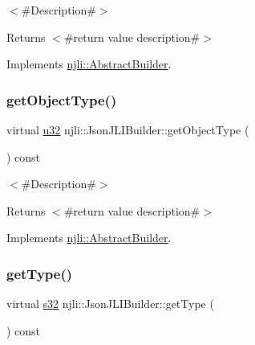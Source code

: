 $<$\#\+Description\#$>$

\begin{DoxyReturn}{Returns}
$<$\#return value description\#$>$ 
\end{DoxyReturn}


Implements \mbox{\hyperlink{classnjli_1_1_abstract_builder_a902f73ea78031b06aca183a417f3413b}{njli\+::\+Abstract\+Builder}}.

\mbox{\label{classnjli_1_1_json_j_l_i_builder_a82d8ed9acc042c7bc9c9a335120d8264}} 
\subsubsection{\texorpdfstring{get\+Object\+Type()}{getObjectType()}}
{\footnotesize\ttfamily virtual \mbox{\hyperlink{_util_8h_a10e94b422ef0c20dcdec20d31a1f5049}{u32}} njli\+::\+Json\+J\+L\+I\+Builder\+::get\+Object\+Type (\begin{DoxyParamCaption}{ }\end{DoxyParamCaption}) const\hspace{0.3cm}{\ttfamily [virtual]}}

$<$\#\+Description\#$>$

\begin{DoxyReturn}{Returns}
$<$\#return value description\#$>$ 
\end{DoxyReturn}


Implements \mbox{\hyperlink{classnjli_1_1_abstract_builder_a0f2d344fcf697b167f4f2b1122b5fb33}{njli\+::\+Abstract\+Builder}}.

\mbox{\label{classnjli_1_1_json_j_l_i_builder_ab7b9d6fc279c1eeaf80f761ef77fb650}} 
\subsubsection{\texorpdfstring{get\+Type()}{getType()}}
{\footnotesize\ttfamily virtual \mbox{\hyperlink{_util_8h_aa62c75d314a0d1f37f79c4b73b2292e2}{s32}} njli\+::\+Json\+J\+L\+I\+Builder\+::get\+Type (\begin{DoxyParamCaption}{ }\end{DoxyParamCaption}) const\hspace{0.3cm}{\ttfamily [virtual]}}

